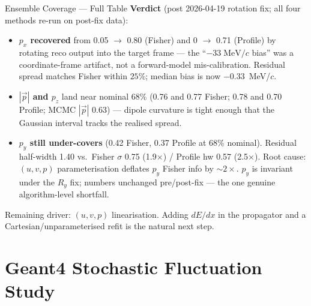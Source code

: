 \documentclass[aspectratio=169]{beamer}
\begin{document}
\begin{frame}{Ensemble Coverage --- Full Table}
\textbf{Verdict} (post 2026-04-19 rotation fix; all four methods re-run on post-fix data):
\begin{itemize}\setlength{\itemsep}{0pt}
\item \textbf{$p_x$ recovered} from 0.05 $\to$ 0.80 (Fisher) and 0 $\to$ 0.71 (Profile) by rotating reco output into the target frame --- the ``$-33\;\mathrm{MeV}/c$ bias'' was a coordinate-frame artifact, not a forward-model mis-calibration. Residual spread matches Fisher within $25\%$; median bias is now $-0.33$~MeV/$c$.
\item \textbf{$|\vec p|$ and $p_z$} land near nominal 68\% (0.76 and 0.77 Fisher; 0.78 and 0.70 Profile; MCMC $|\vec p|$ 0.63) --- dipole curvature is tight enough that the Gaussian interval tracks the realised spread.
\item \textbf{$p_y$ still under-covers} (0.42 Fisher, 0.37 Profile at 68\% nominal). Residual half-width 1.40 vs.\ Fisher $\sigma$ 0.75 (1.9$\times$) / Profile hw 0.57 (2.5$\times$). Root cause: $(u,v,p)$ parameterisation deflates $p_y$ Fisher info by $\sim\!2\times$. $p_y$ is invariant under the $R_y$ fix; numbers unchanged pre/post-fix --- the one genuine algorithm-level shortfall.
\end{itemize}
Remaining driver: $(u,v,p)$ linearisation. Adding $dE/dx$ in the propagator and a Cartesian/unparameterised refit is the natural next step.
\end{frame}

\section{Geant4 Stochastic Fluctuation Study}
\end{document}
